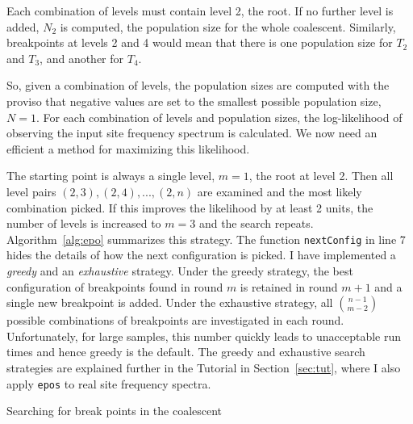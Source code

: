 \documentclass[a4paper, english]{article}
\newcommand{\ty}{\texttt}
\begin{document}
Each combination of levels must contain level 2, the root. If no
further level is added, $N_2$ is computed, the population size for the
whole coalescent. Similarly, breakpoints at levels 2 and 4 would mean
that there is one population size for $T_2$ and $T_3$, and another
for $T_4$.

So, given a combination of levels, the population sizes are computed
with the proviso that negative values are set to the smallest possible
population size, $N=1$. For each combination of levels and population
sizes, the log-likelihood of observing the input site frequency
spectrum is calculated. We now need an efficient a method
for maximizing this likelihood.

The starting point is always a single level, $m=1$, the root at level
2. Then all level pairs $(2,3), (2,4),...,(2,n)$ are examined and the
most likely combination picked. If this improves the likelihood by at
least 2 units, the number of levels is increased to $m=3$ and the
search repeats. Algorithm~\ref{alg:epo} summarizes this strategy. The
function \ty{nextConfig} in line 7 hides the details of how the next
configuration is picked. I have implemented a \emph{greedy} and an
\emph{exhaustive} strategy. Under the greedy strategy, the best
configuration of breakpoints found in round $m$ is retained in round
$m+1$ and a single new breakpoint is added. Under the exhaustive
strategy, all ${n-1\choose m-2}$ possible combinations of breakpoints
are investigated in each round. Unfortunately, for large samples, this
number quickly leads to unacceptable run times and hence greedy is the
default. The greedy and exhaustive search strategies are explained
further in the Tutorial in Section~\ref{sec:tut}, where I also apply
\ty{epos} to real site frequency spectra.

\begin{algorithm}
  \caption{Searching for break points in the coalescent}\label{alg:epo}
  
\end{algorithm}
\end{document}
